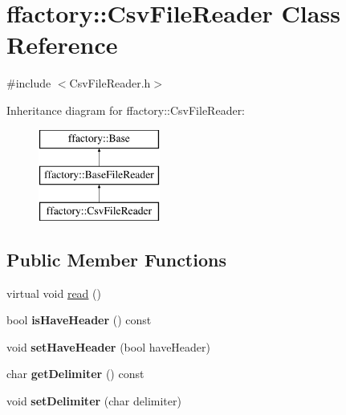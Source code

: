 \hypertarget{classffactory_1_1_csv_file_reader}{\section{ffactory\-:\-:Csv\-File\-Reader Class Reference}
\label{classffactory_1_1_csv_file_reader}
}


{\ttfamily \#include $<$Csv\-File\-Reader.\-h$>$}

Inheritance diagram for ffactory\-:\-:Csv\-File\-Reader\-:\begin{figure}[H]
\begin{center}
\leavevmode
\includegraphics[height=3.000000cm]{classffactory_1_1_csv_file_reader}
\end{center}
\end{figure}
\subsection*{Public Member Functions}
\begin{DoxyCompactItemize}
\item 
virtual void \hyperlink{classffactory_1_1_csv_file_reader_a82882543777400ac3779a89b986a5e98}{read} ()
\item 
\hypertarget{classffactory_1_1_csv_file_reader_a1fa03ef70609068e70834f698ec0eeba}{bool {\bfseries is\-Have\-Header} () const }\label{classffactory_1_1_csv_file_reader_a1fa03ef70609068e70834f698ec0eeba}

\item 
\hypertarget{classffactory_1_1_csv_file_reader_affea39de5d8dbde46828292c6abd5651}{void {\bfseries set\-Have\-Header} (bool have\-Header)}\label{classffactory_1_1_csv_file_reader_affea39de5d8dbde46828292c6abd5651}

\item 
\hypertarget{classffactory_1_1_csv_file_reader_ab95f5d8869771a2bbd334a756d9bbded}{char {\bfseries get\-Delimiter} () const }\label{classffactory_1_1_csv_file_reader_ab95f5d8869771a2bbd334a756d9bbded}

\item 
\hypertarget{classffactory_1_1_csv_file_reader_a626cac1d60076434abaaf87daa52d406}{void {\bfseries set\-Delimiter} (char delimiter)}\label{classffactory_1_1_csv_file_reader_a626cac1d60076434abaaf87daa52d406}

\end{DoxyCompactItemize}
